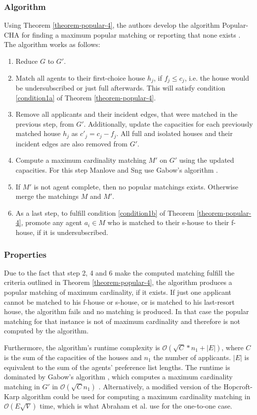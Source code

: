 \subsubsection{Algorithm}
Using Theorem \ref{theorem-popular-4}, the authors develop the algorithm Popular-CHA for finding a maximum popular matching or reporting that none exists \cite{ManlovePopularMatchings}. The algorithm works as follows:
\begin{enumerate}
    \item Reduce $G$ to $G'$.
    \item Match all agents to their first-choice house $h_j$, if $f_j \leq c_j$, i.e. the house would be undersubscribed or just full afterwards. This will satisfy condition \ref{condition1a} of Theorem \ref{theorem-popular-4}.
    \item Remove all applicants and their incident edges, that were matched in the previous step, from $G'$. Additionally, update the capacities for each previously matched house $h_j$ as $c'_j = c_j - f_j$. All full and isolated houses and their incident edges are also removed from $G'$.
    \item Compute a maximum cardinality matching $M'$ on $G'$ using the updated capacities. For this step Manlove and Sng use Gabow's algorithm \cite{Gabow1983}.
    \item If $M'$ is not agent complete, then no popular matchings exists. Otherwise merge the matchings $M$ and $M'$.
    \item As a last step, to fulfill condition \ref{condition1b} of Theorem \ref{theorem-popular-4}, promote any agent $a_i \in M$ who is matched to their s-house to their f-house, if it is undersubscribed. 
\end{enumerate}


\subsubsection{Properties}
Due to the fact that step 2, 4 and 6 make the computed matching fulfill the criteria outlined in Theorem \ref{theorem-popular-4}, the algorithm produces a popular matching of maximum cardinality, if it exists. If just one applicant cannot be matched to his f-house or s-house, or is matched to his last-resort house, the algorithm fails and no matching is produced. In that case the popular matching for that instance is not of maximum cardinality and therefore is not computed by the algorithm. 

Furthermore, the algorithm's runtime complexity is $\mathcal{O}(\sqrt{C} * n_1 + |E|)$, where $C$ is the sum of the capacities of the houses and $n_1$ the number of applicants. $|E|$ is equivalent to the sum of the agents' preference list lengths. The runtime is dominated by Gabow's algorithm \cite{Gabow1983}, which computes a maximum cardinality matching in $G'$ in $\mathcal{O}(\sqrt{C}n_1)$ \cite{ManlovePopularMatchings}. Alternatively, a modified version of the Hopcroft-Karp algorithm could be used for computing a maximum cardinality matching in $\mathcal{O}(E\sqrt{V})$\cite{Hopcroft} time, which is what Abraham et al. use for the one-to-one case.

